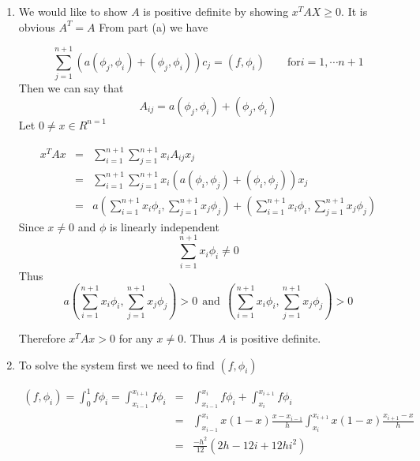 {\begin{solution}
\begin{enumerate}
Therefore

\[
M= \left[\begin{array}{rrrrrrr}
              \frac{2h}{3} &  \frac{h}{6} & 0 & 0 &  \cdots & 0 \\[0.25em]
               \frac{h}{6}  & \frac{2h}{3} & \frac{h}{6} &0 & \cdots & 0 \\
                0& \frac{h}{6} & \frac{2h}{3} & \frac{h}{6} & \cdots & 0\\
                 \vdots & & &\ddots &  & \vdots \\[0.25em]
                 0 & \cdots &  & \frac{h}{6}& \frac{2h}{3} & \frac{h}{6} \\ 
                 0 & &\cdots &  & \frac{h}{6} & \frac{h}{3} 
                   \end{array}\right]
                   \] 


\item We would like to show $A$ is positive definite by showing $x^T A X \geq 0$. It is obvious $A^T = A$ From part (a) we  have 

\[ \sum_{j=1}^{n+1}\left( a( \phi_j, \phi_i) + (\phi_j, \phi_i)\right) c_j   = (f,\phi_i) \qquad \mbox{for} i=1, \cdots n+1\]
Then  we can say that 
\[
A_{ij}= a( \phi_j, \phi_i) + (\phi_j, \phi_i)
\]
Let $0 \neq x \in R^{n=1}$ 

\begin{eqnarray*}
x^T A x&=& \sum_{i=1}^{n+1} \sum_{j=1}^{n+1} x_i A_{ij}  x_j\\
			 &=& \sum_{i=1}^{n+1} \sum_{j=1}^{n+1}  x_i (a( \phi_i, \phi_j) + (\phi_i, \phi_j)) x_j \\
			 &=& a( \sum_{i=1}^{n+1} x_i\phi_i, \sum_{j=1}^{n+1} x_j\phi_j) + ( \sum_{i=1}^{n+1} x_i\phi_i, \sum_{j=1}^{n+1} x_j\phi_j)
\end{eqnarray*}
Since $x\neq 0 $ and $\phi$ is linearly independent 
\[
\sum_{i=1}^{n+1} x_i\phi_i \neq 0
\] 
Thus
 \[
 a( \sum_{i=1}^{n+1} x_i\phi_i, \sum_{j=1}^{n+1} x_j\phi_j) > 0 \:\: \mbox{and} \:\:( \sum_{i=1}^{n+1} x_i\phi_i, \sum_{j=1}^{n+1}  x_j\phi_j) > 0 
 \]

Therefore $ x^T A x >0 $ for any $x\neq 0 $. Thus $A$  is positive definite. 

\item To solve the system first we need to find $(f, \phi_i)$

\begin{eqnarray*}
(f,\phi_i)= \int_0^1 f \phi_i = \int_{x_{i-1}}^{x_{i+1}} f \phi_i &=& \int_{x_{i-1}}^{x_i} f \phi_i + \int_{x_{i}}^{x_{i+1}} f \phi_i\\
																														      	&=& \int_{x_{i-1}}^{x_i} x(1-x) \frac{x-x_{i-1}}{h} \int_{x_i}^{x_{i+1}} x(1-x) \frac{x_{i+1}-x}{h}\\
																																	&=&\frac{-h^2}{12}(2h - 12 i + 12 h i^2)
\end{eqnarray*}


\end{enumerate}
\end{solution}}
